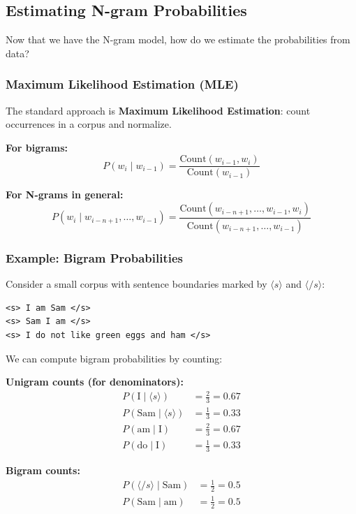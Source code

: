 \documentclass[11pt,a4paper]{article}
\theoremstyle{definition}
\theoremstyle{plain}
\theoremstyle{remark}
\begin{document}
\subsection{Estimating N-gram Probabilities}

Now that we have the N-gram model, how do we estimate the probabilities from data?

\subsubsection{Maximum Likelihood Estimation (MLE)}

The standard approach is \textbf{Maximum Likelihood Estimation}: count occurrences in a corpus and normalize.

\textbf{For bigrams:}
\[
P(w_i \mid w_{i-1}) = \frac{\text{Count}(w_{i-1}, w_i)}{\text{Count}(w_{i-1})}
\]

\textbf{For N-grams in general:}
\[
P(w_i \mid w_{i-n+1}, \ldots, w_{i-1}) = \frac{\text{Count}(w_{i-n+1}, \ldots, w_{i-1}, w_i)}{\text{Count}(w_{i-n+1}, \ldots, w_{i-1})}
\]

\subsubsection{Example: Bigram Probabilities}

Consider a small corpus with sentence boundaries marked by $\langle s \rangle$ and $\langle /s \rangle$:

\begin{verbatim}
<s> I am Sam </s>
<s> Sam I am </s>
<s> I do not like green eggs and ham </s>
\end{verbatim}

We can compute bigram probabilities by counting:

\textbf{Unigram counts (for denominators):}
\begin{align*}
P(\text{I} \mid \langle s \rangle) &= \frac{2}{3} = 0.67 \\
P(\text{Sam} \mid \langle s \rangle) &= \frac{1}{3} = 0.33 \\
P(\text{am} \mid \text{I}) &= \frac{2}{3} = 0.67 \\
P(\text{do} \mid \text{I}) &= \frac{1}{3} = 0.33
\end{align*}

\textbf{Bigram counts:}
\begin{align*}
P(\langle /s \rangle \mid \text{Sam}) &= \frac{1}{2} = 0.5 \\
P(\text{Sam} \mid \text{am}) &= \frac{1}{2} = 0.5
\end{align*}
\end{document}
